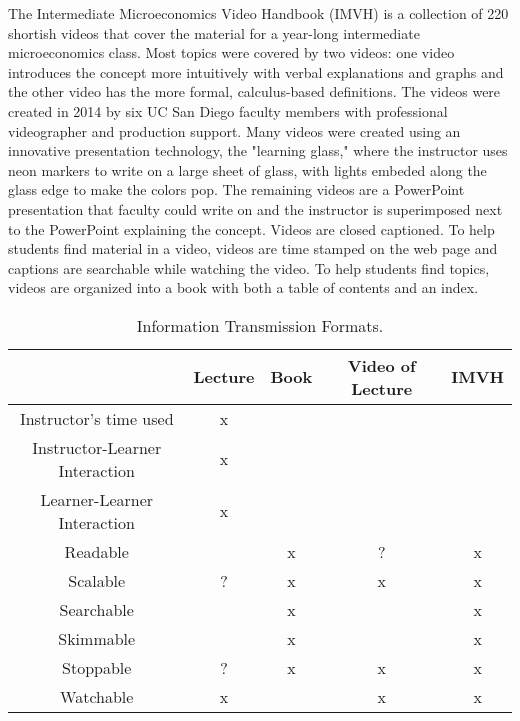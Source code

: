 \documentclass[12pt]{article}
\begin{document}
The Intermediate Microeconomics Video Handbook (IMVH) is a collection of 220 shortish videos that cover the material for a year-long intermediate microeconomics class.  Most topics were covered by two videos: one video introduces the concept more intuitively with verbal explanations and graphs and the other video has the more formal, calculus-based definitions.  The videos were created in 2014 by six UC San Diego faculty members with professional videographer and production support.  Many videos were created using an innovative presentation technology, the "learning glass," where the instructor uses neon markers to write on a large sheet of glass, with lights embeded along the glass edge to make the colors pop.  The remaining videos are a PowerPoint presentation that faculty could write on and the instructor is superimposed next to the PowerPoint explaining the concept.  Videos are closed captioned.  To help students find material in a video, videos are time stamped on the web page and captions are searchable while watching the video.  To help students find topics, videos are organized into a book with both a table of contents and an index.  


\begin{table}
	\caption{Information Transmission Formats.}
	\centering
	\begin{tabular}{c|c|c|c|c} 
		\hline
		& Lecture & Book &  Video of Lecture & IMVH\\
		\hline
		Instructor's time used & x  & & &\\
		Instructor-Learner Interaction & x & & &\\ 
		Learner-Learner Interaction & x & & & \\ 
		Readable & & x & ? & x \\ 
		Scalable & ? & x & x & x\\	
		Searchable & & x & & x \\ 
		Skimmable & & x & & x\\ 
		Stoppable & ? & x & x & x\\ 
		Watchable & x & & x & x\\ 
		
		\hline
		
	\end{tabular} 
	\label{infotransmission}
\end{table}
\end{document}
